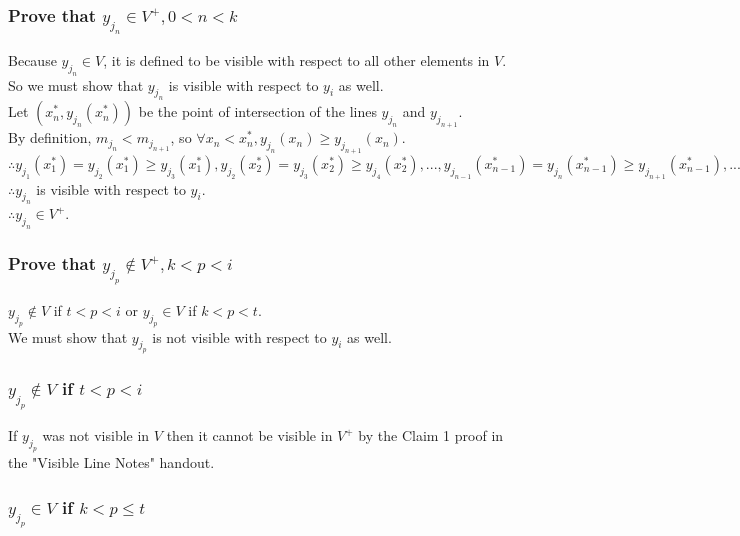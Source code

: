 \documentclass{article}
\begin{document}
\subsubsection*{Prove that $y_{j_n} \in V^+, 0 < n < k$}
Because $y_{j_n} \in V$, it is defined to be visible with respect to all other elements in $V$.\\
So we must show that $y_{j_n}$ is visible with respect to $y_i$ as well.\\
Let $(x^*_n, y_{j_n}(x^*_n))$ be the point of intersection of the lines $y_{j_n}$ and $y_{j_{n+1}}$.\\
By definition, $m_{j_n} < m_{j_{n+1}}$, so $\forall x_n < x^*_n, y_{j_n} (x_n) \geq y_{j_{n+1}} (x_n)$.\\
$\therefore y_{j_{1}}(x^*_{1}) = y_{j_{2}}(x^*_{1}) \geq y_{j_3}(x^*_{1}), y_{j_{2}}(x^*_{2}) = y_{j_{3}}(x^*_{2}) \geq y_{j_4}(x^*_{2}), ..., y_{j_{n-1}}(x^*_{n-1}) = y_{j_{n}}(x^*_{n-1}) \geq y_{j_{n+1}}(x^*_{n-1}), ..., y_{j_{k-1}}(x^*_{k-1}) = y_{j_{k}}(x^*_{k-1}) \geq y_{j_{i}}(x^*_{k-1})$\\
$\therefore y_{j_n}$ is visible with respect to $y_i$.\\
$\therefore y_{j_n} \in V^+$.

\subsubsection*{Prove that $y_{j_p} \notin V^+, k < p < i$}
$y_{j_p} \notin V$ if $t < p < i$ or $y_{j_p} \in V$ if $k < p < t$.\\
We must show that $y_{j_p}$ is not visible with respect to $y_i$ as well.

\subsubsection{$y_{j_p} \notin V$ if $t < p < i$}
If $y_{j_p}$ was not visible in $V$ then it cannot be visible in $V^+$ by the Claim 1 proof in the "Visible Line Notes" handout.\\

\subsubsection{$y_{j_p} \in V$ if $k < p \leq t$}
\end{document}

